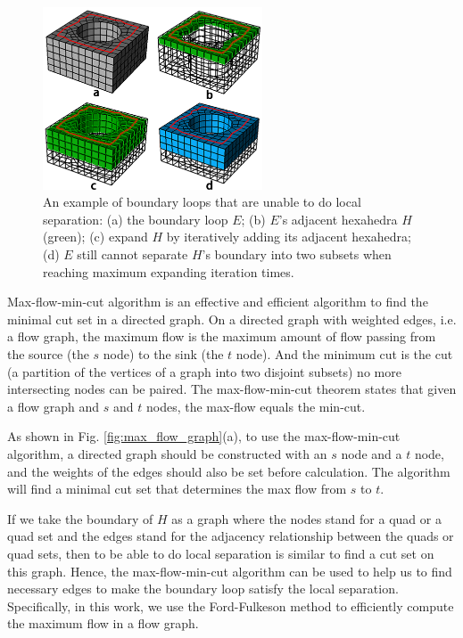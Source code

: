 \documentclass[final,5p,times,twocolumn]{elsarticle}
\begin{document}
\begin{figure}[htbp]
\begin{center}
\includegraphics[width=6.5cm]{local_sep_exam.png}
\caption{An example of boundary loops that are unable to do local separation: (a) the boundary loop $E$; (b) $E$'s adjacent hexahedra $H$(green); (c) expand $H$ by iteratively adding its adjacent hexahedra; (d) $E$ still cannot separate $H$'s boundary into two subsets when reaching maximum expanding iteration times.}
\label{fig:local_sep_exam}
\end{center}
\end{figure}


Max-flow-min-cut algorithm is an effective and efficient algorithm to find the minimal cut set in a directed graph. On a directed graph with weighted edges, i.e. a flow graph, the maximum flow is the maximum amount of flow passing from the source (the $s$ node) to the sink (the $t$ node). And the minimum cut is the cut (a partition of the vertices of a graph into two disjoint subsets) no more intersecting nodes can be paired. The max-flow-min-cut theorem states that given a flow graph and $s$ and $t$ nodes, the max-flow equals the min-cut.

As shown in Fig. \ref{fig:max_flow_graph}(a), to use the max-flow-min-cut algorithm, a directed graph should be constructed with an $s$ node and a $t$ node, and the weights of the edges should also be set before calculation. The algorithm will find a minimal cut set that determines the max flow from $s$ to $t$.

If we take the boundary of $H$ as a graph where the nodes stand for a quad or a quad set and the edges stand for the adjacency relationship between the quads or quad sets, then to be able to do local separation is similar to find a cut set on this graph. Hence, the max-flow-min-cut algorithm can be used to help us to find necessary edges to make the boundary loop satisfy the local separation. Specifically, in this work, we use the Ford-Fulkeson\cite{ford1956maximal} method to efficiently compute the maximum flow in a flow graph.
\end{document}

